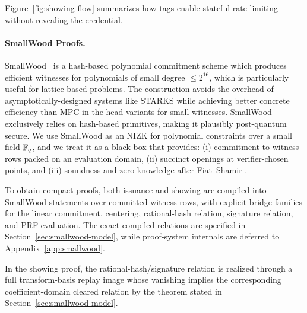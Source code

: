 Figure~\ref{fig:showing-flow} summarizes how tags enable stateful rate limiting without revealing the credential.



\paragraph{SmallWood Proofs.}

SmallWood~\cite{EPRINT:FenRiv25b} is a hash-based polynomial commitment scheme
which produces efficient witnesses for polynomials of small degree $\leq
2^{16}$, which is particularly useful for
lattice-based problems. The construction avoids the overhead of
asymptotically-designed systems like STARKS while achieving better concrete
efficiency than MPC-in-the-head variants for small witnesses. SmallWood exclusively relies on
hash-based primitives, making it plausibly post-quantum secure. 
We use SmallWood as an 
NIZK for polynomial constraints over a small field \(\mathbb{F}_q\), and we treat it as a black box that provides:
(i) commitment to witness rows packed on an evaluation domain, (ii) succinct openings at verifier-chosen points, and
(iii) soundness and zero knowledge after Fiat--Shamir \cite{EPRINT:FenRiv25b}.

To obtain compact proofs, both issuance and showing are compiled into SmallWood statements over committed witness rows, with explicit bridge families for the linear commitment, centering, rational-hash relation, signature relation, and PRF evaluation. The exact compiled relations are specified in Section~\ref{sec:smallwood-model}, while proof-system internals are deferred to Appendix~\ref{app:smallwood}.

In the showing proof, the rational-hash/signature relation is realized through a full transform-basis replay image whose vanishing implies the corresponding coefficient-domain cleared relation by the theorem stated in Section~\ref{sec:smallwood-model}.
